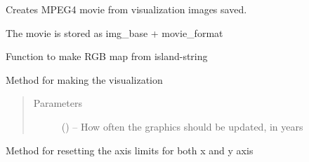 \documentclass[a4paper,10pt,english]{sphinxmanual}
\begin{document}
\begin{fulllineitems}
\begin{fulllineitems}
\begin{quote}
\begin{description}
\end{description}\end{quote}

\end{fulllineitems}


\begin{fulllineitems}
\label{\detokenize{simulation:biosim.simulation.BioSim.make_movie}}
Creates MPEG4 movie from visualization images saved.

The movie is stored as img\_base + movie\_format

\end{fulllineitems}


\begin{fulllineitems}
\label{\detokenize{simulation:biosim.simulation.BioSim.make_rgb_map}}
Function to make RGB map from island-string

\end{fulllineitems}


\begin{fulllineitems}
\label{\detokenize{simulation:biosim.simulation.BioSim.make_visualization}}
Method for making the visualization
\begin{quote}\begin{description}
\item[{Parameters}] \leavevmode
{} () -- How often the graphics should be updated, in years

\end{description}\end{quote}

\end{fulllineitems}


\begin{fulllineitems}
\label{\detokenize{simulation:biosim.simulation.BioSim.reset_axis_limits}}
Method for resetting the axis limits for both x and y axis


\end{fulllineitems}
\end{fulllineitems}
\end{document}
